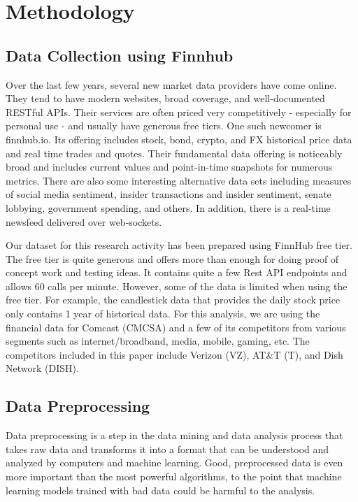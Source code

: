 \documentclass[conference]{IEEEtran}
\begin{document}
\section{Methodology}

\subsection{Data Collection using Finnhub}

Over the last few years, several new market data providers have come online. They tend to have modern websites, broad coverage, and well-documented RESTful APIs.
Their services are often priced very competitively - especially for personal use - and usually have generous free tiers.
One such newcomer is finnhub.io. Its offering includes stock, bond, crypto, and FX historical price data and real time trades and quotes.
Their fundamental data offering is noticeably broad and includes current values and point-in-time snapshots for numerous metrics.
There are also some interesting alternative data sets including measures of social media sentiment, insider transactions and insider sentiment, senate lobbying, government spending, and others.
In addition, there is a real-time newsfeed delivered over web-sockets.\par
Our dataset for this research activity has been prepared using FinnHub free tier.
The free tier is quite generous and offers more than enough for doing proof of concept work and testing ideas.
It contains quite a few Rest API endpoints and allows 60 calls per minute.
However, some of the data is limited when using the free tier.
For example, the candlestick data that provides the daily stock price only contains 1 year of historical data.
For this analysis, we are using the financial data for Comcast (CMCSA) and a few of its competitors from various segments such as internet/broadband, media, mobile, gaming, etc.
The competitors included in this paper include Verizon (VZ), AT\&T (T), and Dish Network (DISH).

\subsection{Data Preprocessing}
Data preprocessing is a step in the data mining and data analysis process that takes raw data and transforms it into a format that can be understood and analyzed by computers and machine learning.
Good, preprocessed data is even more important than the most powerful algorithms, to the point that machine learning models trained with bad data could be harmful to the analysis.
\end{document}
